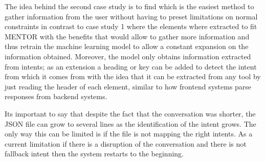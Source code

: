 The idea behind the second case study is to find which is the easiest method to gather information from the user without having to preset limitations on normal constraints in contrast to case study 1 where the elements where extracted to fit MENTOR \cite{recomendationSystem} with the benefits that would allow to gather more information and thus retrain the machine learning model to allow a constant expansion on the information obtained. Moreover, the model only obtains information extracted from intents; as an extension a heading or key can be added to detect the intent from which it comes from with the idea that it can be extracted from any tool by just reading the header of each element, similar to how frontend systems parse responses from backend systems. 

Its important to say that despite the fact that the conversation was shorter, the JSON file can grow to several lines as the identification of the intent grows. The only way this can be limited is if the file is not mapping the right intents. As a current limitation if there is a disruption of the conversation and there is not fallback intent then the system restarts to the beginning.


